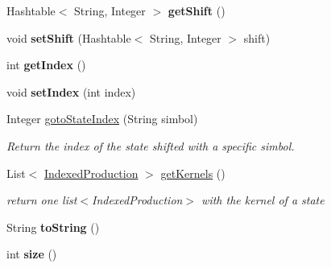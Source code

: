 \begin{DoxyCompactItemize}
\item 
\hypertarget{classcontext_free_1_1parser_1_1_state_a0a46dd3cf055c0aa7951b4df93daf23e}{Hashtable$<$ String, Integer $>$ {\bfseries get\-Shift} ()}\label{classcontext_free_1_1parser_1_1_state_a0a46dd3cf055c0aa7951b4df93daf23e}

\item 
\hypertarget{classcontext_free_1_1parser_1_1_state_a391213320b8ca96be1ede02b449662c7}{void {\bfseries set\-Shift} (Hashtable$<$ String, Integer $>$ shift)}\label{classcontext_free_1_1parser_1_1_state_a391213320b8ca96be1ede02b449662c7}

\item 
\hypertarget{classcontext_free_1_1parser_1_1_state_a2548bf6b7febee3cf305edb33cac19ca}{int {\bfseries get\-Index} ()}\label{classcontext_free_1_1parser_1_1_state_a2548bf6b7febee3cf305edb33cac19ca}

\item 
\hypertarget{classcontext_free_1_1parser_1_1_state_a5ae06a15397a64125c28fd64f5985008}{void {\bfseries set\-Index} (int index)}\label{classcontext_free_1_1parser_1_1_state_a5ae06a15397a64125c28fd64f5985008}

\item 
Integer \hyperlink{classcontext_free_1_1parser_1_1_state_abaac15576397224a4495d8198cfe2f1d}{goto\-State\-Index} (String simbol)
\begin{DoxyCompactList}\small\item\em Return the index of the state shifted with a specific simbol. \end{DoxyCompactList}\item 
List$<$ \hyperlink{classcontext_free_1_1parser_1_1_indexed_production}{Indexed\-Production} $>$ \hyperlink{classcontext_free_1_1parser_1_1_state_a1afb2f9faa5ec548897e44cc863389ba}{get\-Kernels} ()
\begin{DoxyCompactList}\small\item\em return one list$<$\-Indexed\-Production$>$ with the kernel of a state \end{DoxyCompactList}\item 
\hypertarget{classcontext_free_1_1parser_1_1_state_aa480857783a31a4b8ab22f6a92b0f142}{String {\bfseries to\-String} ()}\label{classcontext_free_1_1parser_1_1_state_aa480857783a31a4b8ab22f6a92b0f142}

\item 
\hypertarget{classcontext_free_1_1parser_1_1_state_a6a9e16086ce29535a3e63caadb35a532}{int {\bfseries size} ()}\label{classcontext_free_1_1parser_1_1_state_a6a9e16086ce29535a3e63caadb35a532}

\end{DoxyCompactItemize}
